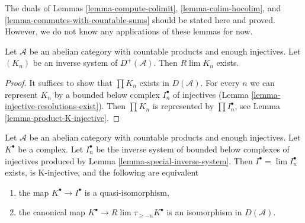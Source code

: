 \noindent
The duals of Lemmas \ref{lemma-compute-colimit},
\ref{lemma-colim-hocolim}, and
\ref{lemma-commutes-with-countable-sums}
should be stated here and proved. However, we do not know any applications
of these lemmas for now.

\begin{lemma}
\label{lemma-inverse-limit-bounded-below}
Let $\mathcal{A}$ be an abelian category with countable products and
enough injectives. Let $(K_n)$ be an inverse system of $D^+(\mathcal{A})$.
Then $R\lim K_n$ exists.
\end{lemma}

\begin{proof}
It suffices to show that $\prod K_n$ exists in $D(\mathcal{A})$.
For every $n$ we can represent $K_n$ by a bounded below complex
$I_n^\bullet$ of injectives (Lemma \ref{lemma-injective-resolutions-exist}).
Then $\prod K_n$ is represented by $\prod I_n^\bullet$, see
Lemma \ref{lemma-product-K-injective}.
\end{proof}

\begin{lemma}
\label{lemma-difficulty-K-injectives}
Let $\mathcal{A}$ be an abelian category with countable products and
enough injectives. Let $K^\bullet$ be a complex. Let $I_n^\bullet$ be
the inverse system of bounded below complexes of injectives produced by
Lemma \ref{lemma-special-inverse-system}. Then
$I^\bullet = \lim I_n^\bullet$ exists, is K-injective, and
the following are equivalent
\begin{enumerate}
\item the map $K^\bullet \to I^\bullet$ is a quasi-isomorphism,
\item the canonical map $K^\bullet \to R\lim \tau_{\geq -n}K^\bullet$
is an isomorphism in $D(\mathcal{A})$.
\end{enumerate}
\end{lemma}

